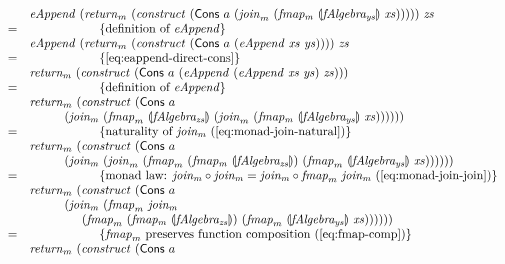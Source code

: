 \documentclass{jfp1}
\newcommand{\fold}[1]{\llparenthesis #1 \rrparenthesis}
\newcommand{\eqAnnotation}[1]{\hspace{2cm}\left\{\textrm{#1}\right\}}
\begin{document}
\begin{proof*}
\begin{displaymath}
\begin{array}{cl}
      & \mathit{eAppend}~(\mathit{return}_m~(\mathit{construct}~(\mathsf{Cons}~a~(\mathit{join}_m~(\mathit{fmap_m}~\fold{\mathit{fAlgebra_{ys}}}~\mathit{xs})))))~\mathit{zs} \\
      =&\eqAnnotation{definition of $\mathit{eAppend}$} \\
      & \mathit{eAppend}~(\mathit{return}_m~(\mathit{construct}~(\mathsf{Cons}~a~(\mathit{eAppend}~\mathit{xs}~\mathit{ys}))))~\mathit{zs} \\
      =&\eqAnnotation{\autoref{eq:eappend-direct-cons}} \\
      & \mathit{return_m}~(\mathit{construct}~(\mathsf{Cons}~a~(\mathit{eAppend}~(\mathit{eAppend}~\mathit{xs}~\mathit{ys})~\mathit{zs}))) \\
      =&\eqAnnotation{definition of $\mathit{eAppend}$} \\
      &\mathit{return}_m~(\mathit{construct}~(\mathsf{Cons}~a~\\
      & \hspace{1cm}(\mathit{join_m}~(\mathit{fmap}_m~\fold{\mathit{fAlgebra_{zs}}}~(\mathit{join}_m~(\mathit{fmap_m}~\fold{\mathit{fAlgebra_{ys}}}~\mathit{xs})))))) \\
      =&\eqAnnotation{naturality of $\mathit{join_m}$ (\autoref{eq:monad-join-natural})} \\
      &\mathit{return}_m~(\mathit{construct}~(\mathsf{Cons}~a~\\
      & \hspace{1cm}(\mathit{join_m}~(\mathit{join}_m~(\mathit{fmap}_m~(\mathit{fmap_m}~\fold{\mathit{fAlgebra_{zs}}})~(\mathit{fmap}_m~\fold{\mathit{fAlgebra_{ys}}}~\mathit{xs})))))) \\
      =&\eqAnnotation{monad law: $\mathit{join_m} \circ \mathit{join_m} = \mathit{join_m} \circ \mathit{fmap}_m~\mathit{join_m}$ (\autoref{eq:monad-join-join})} \\
      &\mathit{return}_m~(\mathit{construct}~(\mathsf{Cons}~a~\\
      & \hspace{1cm}(\mathit{join_m}~(\mathit{fmap}_m~\mathit{join_m}~\\
      & \hspace{1.5cm}(\mathit{fmap}_m~(\mathit{fmap_m}~\fold{\mathit{fAlgebra_{zs}}})~(\mathit{fmap}_m~\fold{\mathit{fAlgebra_{ys}}}~\mathit{xs})))))) \\
      =&\eqAnnotation{$\mathit{fmap}_m$ preserves function composition (\autoref{eq:fmap-comp})} \\
      & \mathit{return}_m~(\mathit{construct}~(\mathsf{Cons}~a~\\

\end{array}
\end{displaymath}
\end{proof*}
\end{document}
